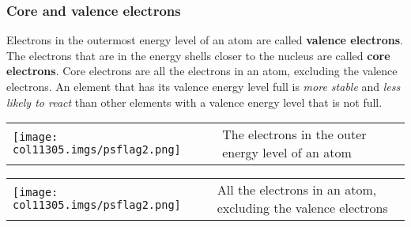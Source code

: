             \subsubsection{ Core and valence electrons}
            \nopagebreak
        \label{m38741*id259935}Electrons in the outermost energy level of an atom are called \textbf{valence electrons}. The electrons that are in the energy shells closer to the nucleus are called \textbf{core electrons}. Core electrons are all the electrons in an atom, excluding the valence electrons. An element that has its valence energy level full is \textsl{more stable} and \textsl{less likely to react} than other elements with a valence energy level that is not full.\par 
\label{m38741*fhsst!!!underscore!!!id755}\begin{definition}
	  \begin{tabular*}{15 cm}{m{15 mm}m{}}
	\hspace*{-50pt}  \texttt{[image: col11305.imgs/psflag2.png]}   & \Definition{   \label{id2421518}\textbf{ Valence electrons }} { \label{m38741*meaningfhsst!!!underscore!!!id755}
        \label{m38741*id259971}The electrons in the outer energy level of an atom \par 
         } 
      \end{tabular*}
      \end{definition}
\label{m38741*fhsst!!!underscore!!!id758}\begin{definition}
	  \begin{tabular*}{15 cm}{m{15 mm}m{}}
	\hspace*{-50pt}  \texttt{[image: col11305.imgs/psflag2.png]}   & \Definition{   \label{id2421542}\textbf{ Core electrons }} { \label{m38741*meaningfhsst!!!underscore!!!id758}
        \label{m38741*id259989}All the electrons in an atom, excluding the valence electrons \par 
         } 
      \end{tabular*}
      \end{definition}
      \label{m38741*uid105}
